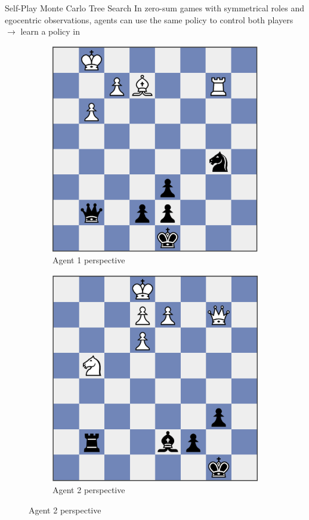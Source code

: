 \begin{frame}[t]{Self-Play Monte Carlo Tree Search}
    In zero-sum games with symmetrical roles and egocentric observations, agents can use the same policy to control both players \pause $\rightarrow$ learn a policy in 

    \begin{figure}[t]
	\centering
	\begin{subfigure}[b]{0.35\textwidth}
            \centering
            \includegraphics[width=.9\textwidth]{images/chapter_9/chess-board}
            \caption{Agent 1 perspective}
	\end{subfigure}
	\hspace{5em}
	\begin{subfigure}[b]{0.35\textwidth}
            \centering
            \includegraphics[width=.9\textwidth]{images/chapter_9/chess-board-transform}
            \caption{Agent 2 perspective}
	\end{subfigure}
    \end{figure}


\end{frame}

